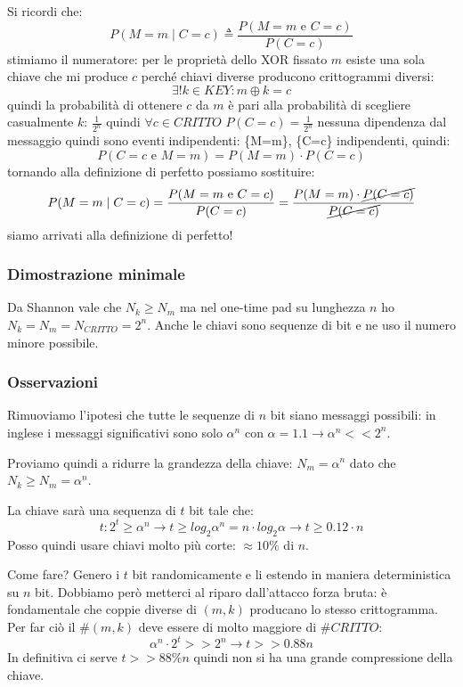 Si ricordi che:
$$ P(M=m \mid C=c) \triangleq \frac{P(M=m\text{ e }C=c)}{P(C=c)} $$
stimiamo il numeratore: per le proprietà dello XOR fissato $m$ esiste una sola chiave che mi produce $c$ perché chiavi diverse producono crittogrammi diversi:
$$ \exists! k \in KEY: m \oplus k = c $$
quindi la probabilità di ottenere $c$ da $m$ è pari alla probabilità di scegliere casualmente $k$: $\frac{1}{2^n}$
quindi $\forall c \in CRITTO$ $P(C=c)=\frac{1}{2^n}$
nessuna dipendenza dal messaggio quindi sono eventi indipendenti: \{M=m\}, \{C=c\} indipendenti, quindi:
$$ P(C=c\text{ e }M=m) = P(M=m) \cdot P(C=c) $$
tornando alla definizione di perfetto possiamo sostituire:
$$
    P(M=m \mid C=c) = \frac{P(M=m\text{ e }C=c)}{P(C=c)} = \frac{P(M=m) \cdot \cancel{P(C=c)}}{\cancel{P(C=c)}}
$$
siamo arrivati alla definizione di perfetto!

\subsubsection{Dimostrazione minimale}
Da Shannon vale che $N_k \geq N_m$ ma nel one-time pad su lunghezza
$n$ ho $N_k = N_m= N_{CRITTO} = 2^n$.
Anche le chiavi sono sequenze di bit e ne uso il numero minore possibile.

\subsubsection{Osservazioni}
Rimuoviamo l'ipotesi che tutte le sequenze di $n$ bit siano messaggi possibili:
in inglese i messaggi significativi sono solo $\alpha^{n}$ con $\alpha = 1.1 \xrightarrow{} \alpha^n << 2^n$.

Proviamo quindi a ridurre la grandezza della chiave:
$N_m = \alpha^n$ dato che $N_k \geq N_m = \alpha^n$.

La chiave sarà una sequenza di $t$ bit tale che:
$$ t: 2^t \geq \alpha^n \xrightarrow{} t \geq log_2\alpha^n = n \cdot log_2\alpha \xrightarrow{} t \geq 0.12 \cdot n$$
Posso quindi usare chiavi molto più corte: $\approx 10\%$ di $n$.

Come fare? Genero i $t$ bit randomicamente e li estendo in maniera deterministica su $n$ bit.
Dobbiamo però metterci al riparo dall'attacco forza bruta: è fondamentale che coppie diverse di
$(m, k)$ producano lo stesso crittogramma. Per far ciò il $\#(m, k)$ deve essere di molto maggiore di $\#CRITTO$:
$$ \alpha^n \cdot 2^t >> 2^n \xrightarrow{} t >> 0.88n$$
In definitiva ci serve $t >> 88\%n$ quindi non si ha una grande compressione della chiave.